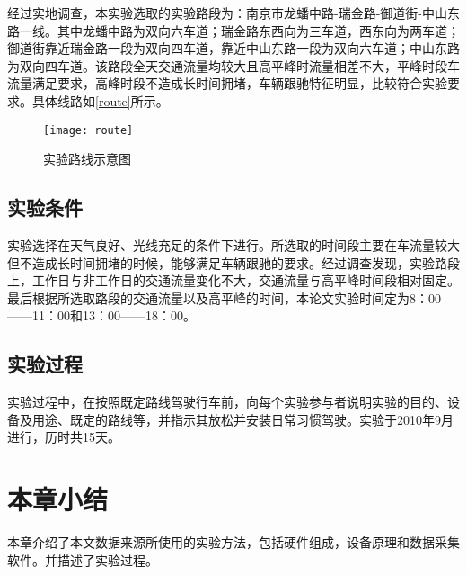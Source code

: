 经过实地调查，本实验选取的实验路段为：南京市龙蟠中路-瑞金路-御道街-中山东路一线。其中龙蟠中路为双向六车道；瑞金路东西向为三车道，西东向为两车道；御道街靠近瑞金路一段为双向四车道，靠近中山东路一段为双向六车道；中山东路为双向四车道。该路段全天交通流量均较大且高平峰时流量相差不大，平峰时段车流量满足要求，高峰时段不造成长时间拥堵，车辆跟驰特征明显，比较符合实验要求。具体线路如\autoref{route}所示。

\begin{figure}[htpb]
	\centering
	\texttt{[image: route]}
	\caption{实验路线示意图}
	\label{route}
\end{figure}

\subsection{实验条件}
实验选择在天气良好、光线充足的条件下进行。所选取的时间段主要在车流量较大但不造成长时间拥堵的时候，能够满足车辆跟驰的要求。经过调查发现，实验路段上，工作日与非工作日的交通流量变化不大，交通流量与高平峰时间段相对固定。最后根据所选取路段的交通流量以及高平峰的时间，本论文实验时间定为8：00——11：00和13：00——18：00。
\subsection{实验过程}
实验过程中，在按照既定路线驾驶行车前，向每个实验参与者说明实验的目的、设备及用途、既定的路线等，并指示其放松并安装日常习惯驾驶。实验于2010年9月进行，历时共15天。



\section{本章小结}
本章介绍了本文数据来源所使用的实验方法，包括硬件组成，设备原理和数据采集软件。并描述了实验过程。
















